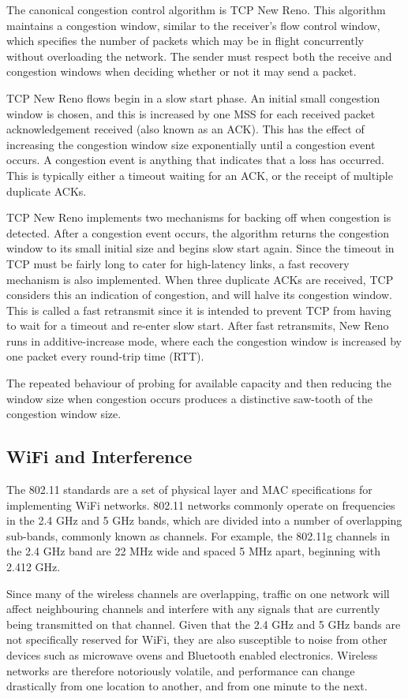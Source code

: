 The canonical congestion control algorithm is TCP New Reno. This algorithm
maintains a congestion window, similar to the receiver's flow control window,
which specifies the number of packets which may be in flight concurrently
without overloading the network. The sender must respect both the receive and
congestion windows when deciding whether or not it may send a packet.

TCP New Reno flows begin in a slow start phase. An initial small congestion
window is chosen, and this is increased by one MSS for each received packet
acknowledgement received (also known as an ACK). This has the effect of
increasing the congestion window size exponentially until a congestion event
occurs. A congestion event is anything that indicates that a loss has occurred.
This is typically either a timeout waiting for an ACK, or the receipt of
multiple duplicate ACKs.

TCP New Reno implements two mechanisms for backing off when congestion is
detected. After a congestion event occurs, the algorithm returns the congestion
window to its small initial size and begins slow start again. Since the timeout
in TCP must be fairly long to cater for high-latency links, a fast
recovery mechanism is also implemented. When three duplicate ACKs are received,
TCP considers this an indication of congestion, and will halve its congestion
window. This is called a fast retransmit since it is intended to prevent TCP
from having to wait for a timeout and re-enter slow start. After fast
retransmits, New Reno runs in additive-increase mode, where each the congestion
window is increased by one packet every round-trip time (RTT).

The repeated behaviour of probing for available capacity and then reducing the
window size when congestion occurs produces a distinctive saw-tooth of the
congestion window size.

\subsection{WiFi and Interference}
\label{sec:bg:wifi}
The 802.11 standards are a set of physical layer and MAC specifications for
implementing WiFi networks. 802.11 networks commonly operate on frequencies in
the 2.4 GHz and 5 GHz bands, which are divided into a number of overlapping
sub-bands, commonly known as channels. For example, the 802.11g channels in
the 2.4 GHz band are 22 MHz wide and spaced 5 MHz apart, beginning with 2.412
GHz.

Since many of the wireless channels are overlapping, traffic on one network will
affect neighbouring channels and interfere with any signals that are currently
being transmitted on that channel. Given that the 2.4 GHz and 5 GHz bands are
not specifically reserved for WiFi, they are also susceptible to noise from
other devices such as microwave ovens and Bluetooth enabled electronics.
Wireless networks are therefore notoriously volatile, and performance can change
drastically from one location to another, and from one minute to the next.

